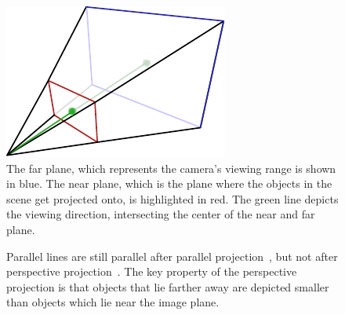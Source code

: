\begin{figure}
\begin{center}
 \includegraphics[scale=1.0]{Images/Frustum.pdf}
 \caption[The view frustum]{The far plane, which represents the camera's viewing
range is shown in blue. The near plane, which is the plane where the objects in
the scene get projected onto, is highlighted in red. The green line depicts the
viewing direction, intersecting the center of the near and far plane.}
 \label{fig:viewfrustum3d}
\end{center} 
\end{figure}
\begin{figure}
\centering
{}
\caption[Parallel and Perspective Projection]{Parallel lines are still parallel
after parallel projection~, but not
after perspective projection~.
The key property of the perspective projection is that objects that lie
farther away are depicted smaller than objects which lie near the image plane.}
\label{fig:projections2d}
\end{figure}
